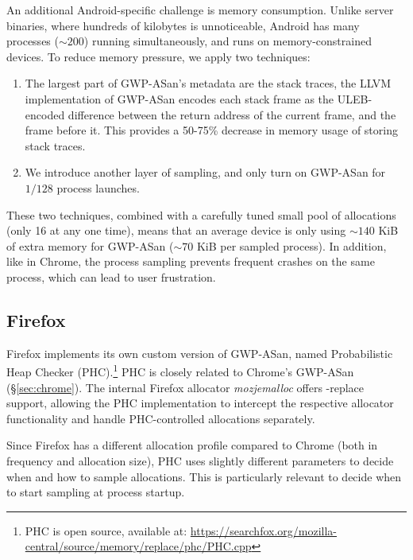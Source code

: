 An additional Android-specific challenge is memory consumption. Unlike server
binaries, where hundreds of kilobytes is unnoticeable, Android has many
processes (\({\sim}200\)) running simultaneously, and runs on
memory-constrained devices. To reduce memory pressure, we apply two techniques:

\begin{enumerate}

  \item {} The largest part of GWP-ASan's
  metadata are the stack traces, the LLVM implementation of GWP-ASan encodes
  each stack frame as the ULEB-encoded difference between the return address of
  the current frame, and the frame before it. This provides a 50-75\% decrease
  in memory usage of storing stack traces.

  \item {} We introduce another layer of sampling,
  and only turn on GWP-ASan for \(1/128\) process launches.

\end{enumerate}

These two techniques, combined with a carefully tuned small pool of allocations
(only 16 at any one time), means that an average device is only using
\({\sim}140\) KiB of extra memory for GWP-ASan (\({\sim}70\) KiB per sampled
process).  In addition, like in Chrome, the process sampling prevents frequent
crashes on the same process, which can lead to user frustration.

\subsection{Firefox}

Firefox implements its own custom version of GWP-ASan, named Probabilistic Heap
Checker (PHC).\footnote{PHC is open source, available at:
\url{https://searchfox.org/mozilla-central/source/memory/replace/phc/PHC.cpp}}
PHC is closely related to Chrome's GWP-ASan (\S\ref{sec:chrome}). The internal
Firefox allocator \emph{mozjemalloc} offers -replace support,
allowing the PHC implementation to intercept the respective allocator
functionality and handle PHC-controlled allocations separately.

Since Firefox has a different allocation profile compared to Chrome (both in
frequency and allocation size), PHC uses slightly different parameters to
decide when and how to sample allocations. This is particularly relevant to
decide when to start sampling at process startup.

